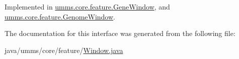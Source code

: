 Implemented in \hyperlink{classumms_1_1core_1_1feature_1_1_gene_window_af40fab362891f30799d0680beea273c1}{umms.\+core.\+feature.\+Gene\+Window}, and \hyperlink{classumms_1_1core_1_1feature_1_1_genome_window_aa03e0fb867f659eba10ca1144469063d}{umms.\+core.\+feature.\+Genome\+Window}.



The documentation for this interface was generated from the following file\+:\begin{DoxyCompactItemize}
\item 
java/umms/core/feature/\hyperlink{_window_8java}{Window.\+java}\end{DoxyCompactItemize}
